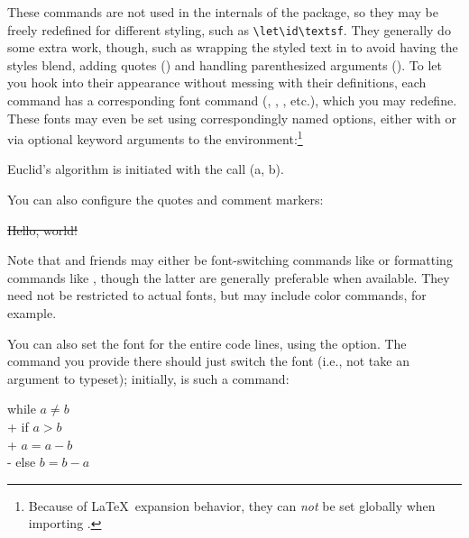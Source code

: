 \documentclass[a4paper]{article}
\def\refc{\refCom*}
\def\refe{\refEnv*}
\def\refk{\refKey*}
\begin{document}
These commands are not used in the internals of the package, so they may be
freely redefined for different styling, such as \verb|\let\id\textsf|. They
generally do some extra work, though, such as wrapping the styled text in
 to avoid having the styles blend, adding quotes () and
handling parenthesized arguments (). To let you hook into their
appearance without messing with their definitions, each command has a
corresponding font command (, , , etc.),
which you may redefine. These fonts may even be set using correspondingly
named options, either with \refc{pseudoset} or via optional keyword arguments
to the \refe{pseudo} environment:\footnote{Because of \LaTeX\ expansion
behavior, they can \emph{not} be set globally when importing .}
\begin{texexp}
Euclid's algorithm is initiated with the call (a, b).
\end{texexp}
\noindent
You can also configure the quotes and comment markers:
\begin{texexp}
\begin{pseudo}
 \st{Hello, world!} \quad {}
\end{pseudo}
\end{texexp}
%
Note that  and friends may either be font-switching commands like
 or formatting commands like , though the latter are
generally preferable when available. They need not be restricted to actual
fonts, but may include color commands, for example.

You can also set the font for the entire code lines, using the \refk{font}
option. The command you provide there should just switch the font (i.e., not
take an argument to typeset); initially,  is such a command:

\begin{texexp}
\begin{pseudo}[font=\kwfont]
while $a \neq b$                                \\+
    if $a > b$                                  \\+
        $a = a - b$                             \\-
    else $b = b - a$
\end{pseudo}
\end{texexp}
\end{document}
